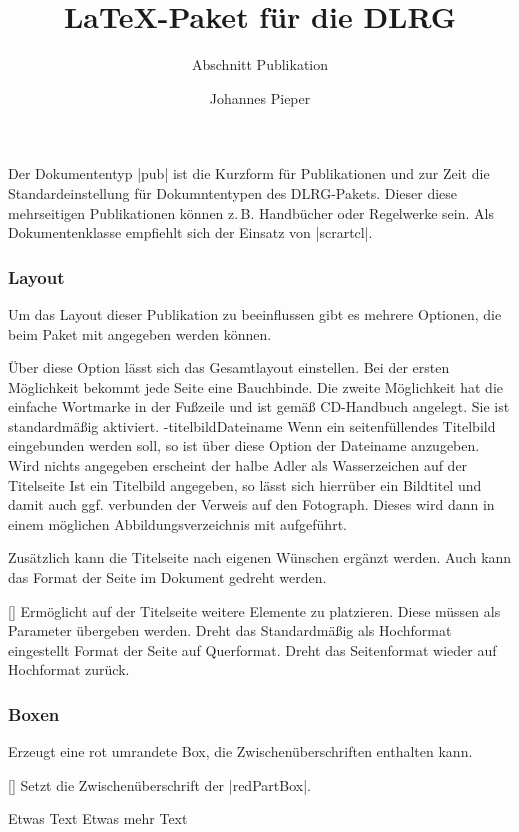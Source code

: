 \documentclass[
    a4paper,
    12pt,
    parskip=half
]{scrartcl}
\title{\LaTeX{}-Paket für die DLRG}
\subtitle{Abschnitt Publikation}
\author{Johannes Pieper}
\begin{document}
Der Dokumententyp \verbcode|pub| ist die Kurzform für Publikationen und zur Zeit die Standardeinstellung für Dokumntentypen des DLRG-Pakets. Dieser diese mehrseitigen Publikationen können z.\,B. Handbücher oder Regelwerke sein. Als Dokumentenklasse empfiehlt sich der Einsatz von \verbcode|scrartcl|.

\subsubsection{Layout}
Um das Layout dieser Publikation zu beeinflussen gibt es mehrere Optionen, die beim Paket mit angegeben werden können.
\begin{options}
        Über diese Option lässt sich das Gesamtlayout einstellen.
        Bei der ersten Möglichkeit bekommt jede Seite eine Bauchbinde. Die zweite Möglichkeit hat die einfache Wortmarke in der Fußzeile und ist gemäß CD-Handbuch \autocite[S.~13]{DLRG_CD2019} angelegt. Sie ist standardmäßig aktiviert.
    \keyval-{titelbild}{Dateiname}
        Wenn ein seitenfüllendes Titelbild eingebunden werden soll, so ist über diese Option der Dateiname anzugeben. Wird nichts angegeben erscheint der halbe Adler als Wasserzeichen auf der Titelseite
        Ist ein Titelbild angegeben, so lässt sich hierrüber ein Bildtitel und damit auch ggf. verbunden der Verweis auf den Fotograph. Dieses wird dann in einem möglichen Abbildungsverzeichnis mit aufgeführt.
\end{options}

Zusätzlich kann die Titelseite nach eigenen Wünschen ergänzt werden. Auch kann das Format der Seite im Dokument gedreht werden.

\begin{commands}
    [] Ermöglicht auf der Titelseite weitere Elemente zu platzieren. Diese müssen als Parameter übergeben werden.
        Dreht das Standardmäßig als Hochformat eingestellt Format der Seite auf Querformat.
        Dreht das Seitenformat wieder auf Hochformat zurück.
\end{commands}

\subsubsection{Boxen}
\begin{environments}
    Erzeugt eine rot umrandete Box, die Zwischenüberschriften enthalten kann.
    \begin{commands}
        []
        Setzt die Zwischenüberschrift der \verbcode|redPartBox|.
    \end{commands}
    \begin{example}[gobble=8]
        \begin{redPartBox}
            Etwas Text
            Etwas mehr Text
        \end{redPartBox}
    \end{example}
\end{environments}
\end{document}

